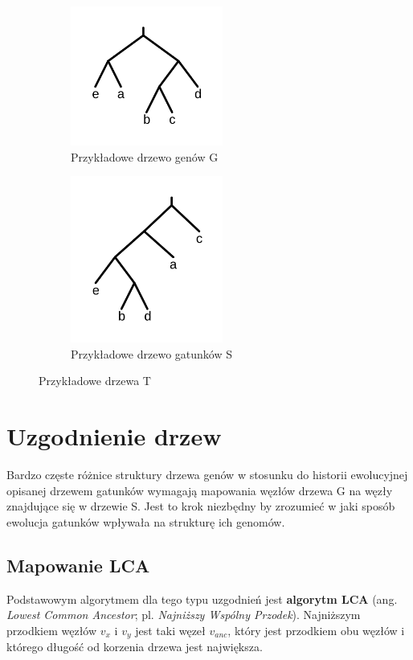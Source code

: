 \documentclass[licencjacka]{pracamgr}
\begin{document}
\begin{figure}[H]
\centering
\begin{subfigure}{.5\textwidth}
  \centering
  \includegraphics[width=50mm]{./pictures/gene.png}
  \caption{Przykładowe drzewo genów G}
  \label{fig:sub2}
\end{subfigure}%
\begin{subfigure}{.5\textwidth}
  \centering
  \includegraphics[width=50mm]{./pictures/species.png}
  \caption{Przykładowe drzewo gatunków S}
  \label{fig:sub1}
\end{subfigure}%
\caption{Przykładowe drzewa T \cite{gsevol}}
\label{fig:test}
\end{figure}

\section{Uzgodnienie drzew}
Bardzo częste różnice struktury drzewa genów w stosunku do historii ewolucyjnej opisanej drzewem gatunków wymagają mapowania węzłów drzewa G na węzły znajdujące się w drzewie S. Jest to krok niezbędny by zrozumieć w jaki sposób ewolucja gatunków wpływała na strukturę ich genomów. 

\subsection{Mapowanie LCA}
Podstawowym algorytmem dla tego typu uzgodnień jest \textbf{algorytm LCA} (ang. \textit{Lowest Common Ancestor}; pl. \textit{Najniższy Wspólny Przodek}). Najniższym przodkiem węzłów $v_x$ i $v_y$ jest taki węzeł $v_{anc}$, który jest przodkiem obu węzłów i którego długość od korzenia drzewa jest największa.
\end{document}
